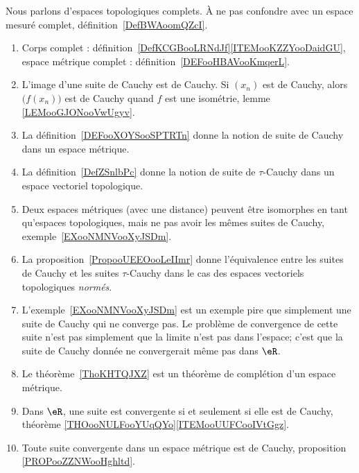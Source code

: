      \label{THMooOCXTooWenIJE}

Nous parlons d'espaces topologiques complets. À ne pas confondre avec un espace mesuré complet, définition~\ref{DefBWAoomQZcI}.

\begin{enumerate}
	\item
	      Corps complet : définition~\ref{DefKCGBooLRNdJf}\ref{ITEMooKZZYooDaidGU}, espace métrique complet : définition~\ref{DEFooHBAVooKmqerL}.
	\item
	      L'image d'une suite de Cauchy est de Cauchy. Si \( (x_n)\) est de Cauchy, alors \( \big( f(x_n) \big)\) est de Cauchy quand \( f\) est une isométrie, lemme \ref{LEMooGJONooVwUgyv}.
	\item
	      La définition~\ref{DEFooXOYSooSPTRTn} donne la notion de suite de Cauchy dans un espace métrique.
	\item
	      La définition~\ref{DefZSnlbPc} donne la notion de suite de \( \tau\)-Cauchy dans un espace vectoriel topologique.
	\item
	      Deux espaces métriques (avec une distance) peuvent être isomorphes en tant qu'espaces topologiques, mais ne pas avoir les mêmes suites de Cauchy, exemple~\ref{EXooNMNVooXyJSDm}.
	\item
	      La proposition~\ref{PropooUEEOooLeIImr} donne l'équivalence entre les suites de Cauchy et les suites \( \tau\)-Cauchy dans le cas des espaces vectoriels topologiques \emph{normés}.
	\item
	      L'exemple~\ref{EXooNMNVooXyJSDm} est un exemple pire que simplement une suite de Cauchy qui ne converge pas. Le problème de convergence de cette suite n'est pas simplement que la limite n'est pas dans l'espace; c'est que la suite de Cauchy donnée ne convergerait même pas dans \( \eR\).
	\item
	      Le théorème~\ref{ThoKHTQJXZ} est un théorème de complétion d'un espace métrique.
	\item
	      Dans \( \eR\), une suite est convergente si et seulement si elle est de Cauchy, théorème \ref{THOooNULFooYUqQYo}\ref{ITEMooUUFCooIVtGgz}.
	\item
	      Toute suite convergente dans un espace métrique est de Cauchy, proposition \ref{PROPooZZNWooHghltd}.
\end{enumerate}

